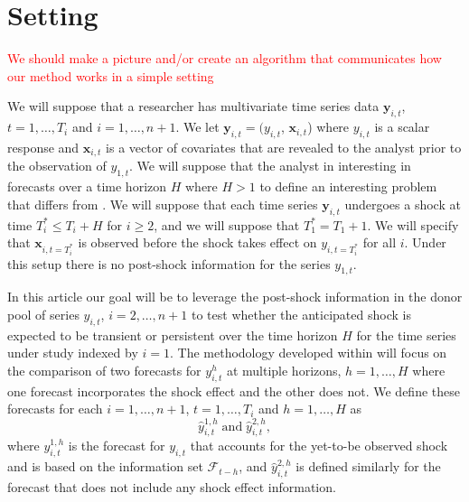 \documentclass[11pt]{article}
\newcommand{\x}{\textbf{x}}
\newcommand{\y}{\textbf{y}}
\theoremstyle{definition}
\begin{document}
\section{Setting}
\label{section2}

\textcolor{red}{We should make a picture and/or create an algorithm that communicates how our method works in a simple setting} \vspace*{0.5cm}


We will suppose that a researcher has multivariate time series data $\y_{i,t}$, $t = 1, \ldots,  T_i$ and $i = 1, \ldots, n+1$. We let $\y_{i,t} = (y_{i,t}$, $\x_{i,t}$) where $y_{i,t}$ is a scalar response and $\x_{i,t}$ is a vector of covariates that are revealed to the analyst prior to the observation of $y_{1,t}$.  We will suppose that the analyst in interesting in forecasts over a time horizon $H$ where $H > 1$ to define an interesting problem that differs from \cite{lin2021minimizing}.
We will suppose that each time series $\y_{i,t}$ undergoes a shock at time $T^*_i \leq T_i + H$ for $i \geq 2$, and we will suppose that $T^*_1 = T_1 + 1$. 
We will specify that $\x_{i,t=T^*_i}$ is observed before the shock takes effect on $y_{i,t=T^*_i}$ for all $i$. Under this setup there is no post-shock information for the series $y_{1,t}$. 

In this article our goal will be to leverage the post-shock information in the donor pool of series $y_{i,t}$, $i = 2,\ldots,n+1$ to test whether the anticipated shock is expected to be transient or persistent over the time horizon $H$ for the time series under study indexed by $i=1$. The methodology developed within will focus on the comparison of two forecasts for $y_{i,t}^h$ at multiple horizons, $h = 1, \ldots, H$ where one forecast incorporates the shock effect and the other does not. We define these forecasts for each $i = 1,\ldots,n+1$, $t = 1,\ldots,T_i$ and $h = 1,\ldots,H$ as
$$
  \hat y^{1,h}_{i,t} \; \text{and} \; \hat y^{2,h}_{i,t},
$$
where $y^{1,h}_{i,t}$ is the forecast for $y_{i,t}$ that accounts for the yet-to-be observed shock and is based on the information set $\mathcal{F}_{t-h}$, and $\hat y^{2,h}_{i,t}$ is defined similarly for the forecast that does not include any shock effect information.
\end{document}
